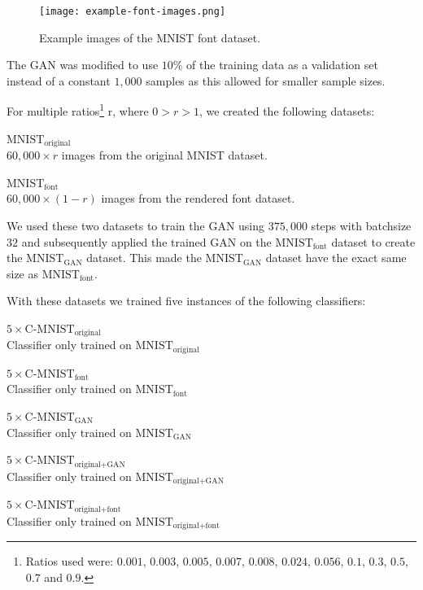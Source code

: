 \documentclass[10pt,twocolumn,letterpaper]{article}
\begin{document}
\begin{figure}[t]
\begin{center}
\texttt{[image: example-font-images.png]}%
\end{center}
   \caption{Example images of the MNIST font dataset.}
\label{fig:example-font-images}
\end{figure}

The GAN was modified to use $10\%$ of the training data as a validation set instead of a constant $1,000$ samples as this allowed for smaller sample sizes.

For multiple ratios\footnote{ Ratios used were: $0.001$, $0.003$, $0.005$, $0.007$, $0.008$, $0.024$, $0.056$, $0.1$, $0.3$, $0.5$, $0.7$ and $0.9$. } r, where $0 > r > 1$, we created the following datasets:

\begin{description}
	\item{$\text{MNIST}_\text{original}$} \hfill \\ $60,000 \times r$ images from the original MNIST dataset.
	\item{$\text{MNIST}_\text{font}$} \hfill \\ $60,000 \times (1 - r)$ images from the rendered font dataset.
\end{description}

We used these two datasets to train the GAN using $375,000$ steps with batchsize $32$ and subsequently applied the trained GAN on the $\text{MNIST}_\text{font}$ dataset to create the $\text{MNIST}_\text{GAN}$ dataset. This made the $\text{MNIST}_\text{GAN}$ dataset have the exact same size as $\text{MNIST}_\text{font}$.

\clearpage
With these datasets we trained five instances of the following classifiers:

\begin{description}
	\item{$5\times \text{C-MNIST}_\text{original}$} \hfill \\ Classifier only trained on $\text{MNIST}_\text{original}$
	\item{$5\times \text{C-MNIST}_\text{font}$} \hfill \\ Classifier only trained on $\text{MNIST}_\text{font}$
	\item{$5\times \text{C-MNIST}_\text{GAN}$} \hfill \\ Classifier only trained on $\text{MNIST}_\text{GAN}$
	\item{$5\times \text{C-MNIST}_\text{original+GAN}$} \hfill \\ Classifier only trained on $\text{MNIST}_\text{original+GAN}$
	\item{$5\times \text{C-MNIST}_\text{original+font}$} \hfill \\ Classifier only trained on $\text{MNIST}_\text{original+font}$
\end{description}
\end{document}
